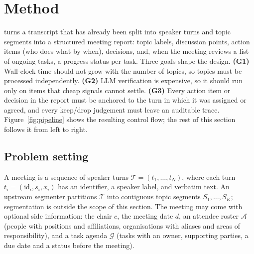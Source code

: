 
\section{Method}
\label{sec:method}

\method{} turns a transcript that has already been split into speaker turns and topic segments into a structured meeting report: topic labels, discussion points, action items (who does what by when), decisions, and, when the meeting reviews a list of ongoing tasks, a progress status per task.
Three goals shape the design.
\textbf{(G1)} Wall-clock time should not grow with the number of topics, so topics must be processed independently.
\textbf{(G2)} LLM verification is expensive, so it should run only on items that cheap signals cannot settle.
\textbf{(G3)} Every action item or decision in the report must be anchored to the turn in which it was assigned or agreed, and every keep/drop judgement must leave an auditable trace.
Figure~\ref{fig:pipeline} shows the resulting control flow; the rest of this section follows it from left to right.



\subsection{Problem setting}
\label{sec:method:setting}

A meeting is a sequence of speaker turns $\mathcal{T}=(t_1,\dots,t_N)$, where each turn $t_i=(\mathrm{id}_i, s_i, x_i)$ has an identifier, a speaker label, and verbatim text.
An upstream segmenter partitions $\mathcal{T}$ into contiguous topic segments $S_1,\dots,S_K$; segmentation is outside the scope of this section.
The meeting may come with optional side information: the chair $c$, the meeting date $d$, an attendee roster $\mathcal{A}$ (people with positions and affiliations, organisations with aliases and areas of responsibility), and a task agenda $\mathcal{G}$ (tasks with an owner, supporting parties, a due date and a status before the meeting).


